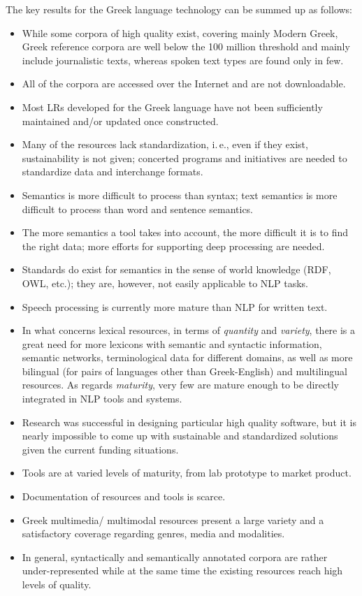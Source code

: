 \documentclass[]{../../metanetpaper}
\begin{document}
\begin{multicols}{2}
The key results for the Greek language technology can be summed up as follows:

\begin{itemize}
\item While some corpora of high quality exist, covering mainly Modern Greek, Greek reference corpora are well below the 100 million threshold and mainly include journalistic texts, whereas spoken text types are found only in few. 
\item All of the corpora are accessed over the Internet and are not downloadable. 
\item Most LRs developed for the Greek language have not been sufficiently maintained and/or updated once constructed. 
\item Many of the resources lack standardization, i.\,e., even if they exist, sustainability is not given; concerted programs and initiatives are needed to standardize data and interchange formats. 
\item Semantics is more difficult to process than syntax; text semantics is more difficult to process than word and sentence semantics.
\item The more semantics a tool takes into account, the more difficult it is to find the right data; more efforts for supporting deep processing are needed.
\item Standards do exist for semantics in the sense of world knowledge (RDF, OWL, etc.); they are, however, not easily applicable to NLP tasks.
\item Speech processing is currently more mature than NLP for written text. 
\item In what concerns lexical resources, in terms of \textit{quantity} and \textit{variety}, there is a great need for more lexicons with semantic and syntactic information, semantic networks, terminological data for different domains, as well as more bilingual (for pairs of languages other than Greek-English) and multilingual resources. As regards \textit{maturity}, very few are mature enough to be directly integrated in NLP tools and systems. 
\item Research was successful in designing particular high quality software, but it is nearly impossible to come up with sustainable and standardized solutions given the current funding situations. 
\item Tools are at varied levels of maturity, from lab prototype to market product. 
\item Documentation of resources and tools is scarce. 
\item Greek multimedia/ multimodal resources present a large variety and a satisfactory coverage regarding genres, media and modalities. 
\item In general, syntactically and semantically annotated corpora are rather under-represented while at the same time the existing resources reach high levels of quality. 
\end{itemize}


\end{multicols}
\end{document}

